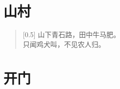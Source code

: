 \documentclass[12pt,UTF-8,openany]{ctexbook}
\begin{document}
\hanzibox{}\hanzibox{}\hanzibox{}\hanzibox{}\hspace{1em}\hanzibox{}\hanzibox{}\hanzibox{}\hanzibox{}






\chapter{山村}

\begin{large}
    
    \begin{verse}[0.5\linewidth]
        山下青石路，田中牛马肥。 \\
        只闻鸡犬叫，不见农人归。
    \end{verse}
    
\end{large}


\clearpage

\begin{center}
    
    
\end{center}


\hanzibox{}\hanzibox{}\hanzibox{}\hanzibox{}\hspace{1em}\hanzibox{}\hanzibox{}\hanzibox{}\hanzibox{}

\hanzibox{}\hanzibox{}\hanzibox{}\hanzibox{}\hspace{1em}\hanzibox{}\hanzibox{}\hanzibox{}\hanzibox{}

\hanzibox{}\hanzibox{}\hanzibox{}\hanzibox{}\hspace{1em}\hanzibox{}\hanzibox{}\hanzibox{}\hanzibox{}

\hanzibox{}\hanzibox{}\hanzibox{}\hanzibox{}\hspace{1em}\hanzibox{}\hanzibox{}\hanzibox{}\hanzibox{}






\chapter{开门}
\end{document}
